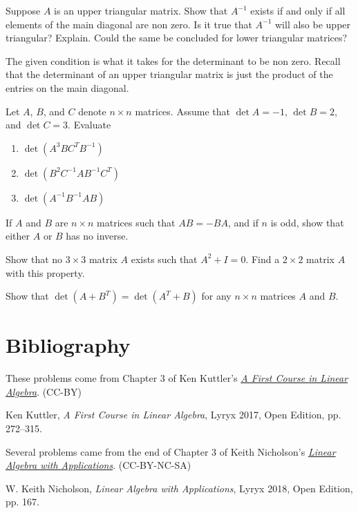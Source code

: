 \documentclass{ximera}
\begin{document}
\begin{problem}\label{prb:7.40} Suppose $A$ is an upper triangular matrix. Show that $A^{-1}$ exists
if and only if all elements of the main diagonal are non zero. Is it true
that $A^{-1}$ will also be upper triangular? Explain. Could the same be concluded for lower triangular matrices?
\begin{hint}
The given condition is what it takes for the
determinant to be non zero. Recall that the determinant of an upper
triangular matrix is just the product of the entries on the main diagonal.
\end{hint}
\end{problem}

\begin{problem}\label{prob:nich3.2.3}
Let $A$, $B$, and $C$ denote $n\times n$ matrices.  Assume that $\det A=-1$, $\det B=2$, and $\det C=3$.  Evaluate
\begin{enumerate}
    \item $\det (A^3BC^TB^{-1})$
    \item $\det (B^2C^{-1}AB^{-1}C^T)$
    \item $\det (A^{-1}B^{-1}AB)$
\end{enumerate}
    
\end{problem}

\begin{problem}\label{prob:nich3.2.12}
If $A$ and $B$ are $n\times n$ matrices such that $AB =-BA$, and if $n$ is odd, show that either $A$ or $B$ has no inverse.
\end{problem}

\begin{problem}\label{prob:nich3.2.16}
    Show that no $3\times 3$ matrix $A$ exists such
that $A^2+I = 0$. Find a $2\times 2$ matrix $A$ with this property.
\end{problem}

\begin{problem}\label{prob:nich3.2.17}
    Show that $\det (A+B^T ) = \det (A^T +B)$
for any $n\times n$ matrices $A$ and $B$.
\end{problem}



\section*{Bibliography}

These problems come from Chapter 3 of Ken Kuttler's \href{https://open.umn.edu/opentextbooks/textbooks/a-first-course-in-linear-algebra-2017}{\it A First Course in Linear Algebra}. (CC-BY)

Ken Kuttler, {\it  A First Course in Linear Algebra}, Lyryx 2017, Open Edition, pp. 272--315.  

Several problems came from the end of Chapter 3 of Keith Nicholson's \href{https://open.umn.edu/opentextbooks/textbooks/linear-algebra-with-applications}{\it Linear Algebra with Applications}. (CC-BY-NC-SA)

W. Keith Nicholson, {\it Linear Algebra with Applications}, Lyryx 2018, Open Edition, pp. 167. 
\end{document}
